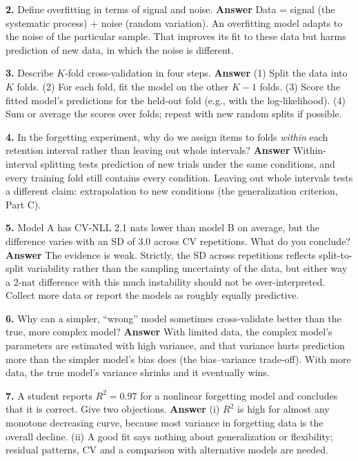 \textbf{2.} Define overfitting in terms of signal and noise.
\textbf{Answer} Data = signal (the systematic process) + noise (random
variation). An overfitting model adapts to the noise of the particular
sample. That improves its fit to these data but harms prediction of new
data, in which the noise is different.

\textbf{3.} Describe \(K\)-fold cross-validation in four steps.
\textbf{Answer} (1) Split the data into \(K\) folds. (2) For each fold,
fit the model on the other \(K-1\) folds. (3) Score the fitted model's
predictions for the held-out fold (e.g., with the log-likelihood). (4)
Sum or average the scores over folds; repeat with new random splits if
possible.

\textbf{4.} In the forgetting experiment, why do we assign items to
folds \emph{within} each retention interval rather than leaving out
whole intervals? \textbf{Answer} Within-interval splitting tests
prediction of new trials under the same conditions, and every training
fold still contains every condition. Leaving out whole intervals tests a
different claim: extrapolation to new conditions (the generalization
criterion, Part C).

\textbf{5.} Model A has CV-NLL 2.1 nats lower than model B on average,
but the difference varies with an SD of 3.0 across CV repetitions. What
do you conclude? \textbf{Answer} The evidence is weak. Strictly, the SD
across repetitions reflects split-to-split variability rather than the
sampling uncertainty of the data, but either way a 2-nat difference with
this much instability should not be over-interpreted. Collect more data
or report the models as roughly equally predictive.

\textbf{6.} Why can a simpler, ``wrong'' model sometimes cross-validate
better than the true, more complex model? \textbf{Answer} With limited
data, the complex model's parameters are estimated with high variance,
and that variance hurts prediction more than the simpler model's bias
does (the bias--variance trade-off). With more data, the true model's
variance shrinks and it eventually wins.

\textbf{7.} A student reports \(R^2 = 0.97\) for a nonlinear forgetting
model and concludes that it is correct. Give two objections.
\textbf{Answer} (i) \(R^2\) is high for almost any monotone decreasing
curve, because most variance in forgetting data is the overall decline.
(ii) A good fit says nothing about generalization or flexibility;
residual patterns, CV and a comparison with alternative models are
needed.


